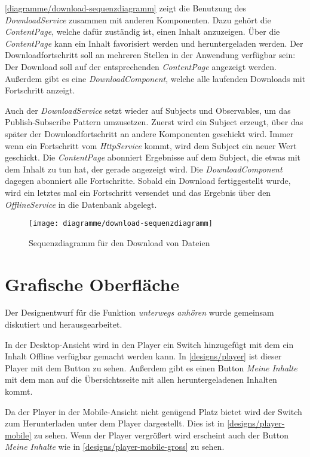 \autoref{diagramme/download-sequenzdiagramm} zeigt die Benutzung des \textit{DownloadService} zusammen mit anderen Komponenten. Dazu gehört die \textit{ContentPage}, welche dafür zuständig ist, einen Inhalt anzuzeigen. Über die \textit{ContentPage} kann ein Inhalt favorisiert werden und heruntergeladen werden. Der Downloadfortschritt soll an mehreren Stellen in der Anwendung verfügbar sein: Der Download soll auf der entsprechenden \textit{ContentPage} angezeigt werden. Außerdem gibt es eine \textit{DownloadComponent}, welche alle laufenden Downloads mit Fortschritt anzeigt. 

Auch der \textit{DownloadService} setzt wieder auf Subjects und Observables, um das Publish-Subscribe Pattern umzusetzen. Zuerst wird ein Subject erzeugt, über das später der Downloadfortschritt an andere Komponenten geschickt wird. Immer wenn ein Fortschritt vom \textit{HttpService} kommt, wird dem Subject ein neuer Wert geschickt. Die \textit{ContentPage} abonniert Ergebnisse auf dem Subject, die etwas mit dem Inhalt zu tun hat, der gerade angezeigt wird. Die \textit{DownloadComponent} dagegen abonniert alle Fortschritte. Sobald ein Download fertiggestellt wurde, wird ein letztes mal ein Fortschritt versendet und das Ergebnis über den \textit{OfflineService} in die Datenbank abgelegt.

\begin{sidewaysfigure}
 \texttt{[image: diagramme/download-sequenzdiagramm]}
  \caption{Sequenzdiagramm für den Download von Dateien}
  \label{diagramme/download-sequenzdiagramm}
\end{sidewaysfigure}

\section{Grafische Oberfläche}
Der Designentwurf für die Funktion \textit{unterwegs anhören} wurde gemeinsam diskutiert und herausgearbeitet. 

In der Desktop-Ansicht wird in den Player ein Switch hinzugefügt mit dem ein Inhalt Offline verfügbar gemacht werden kann. In \autoref{designs/player} ist dieser Player mit dem Button zu sehen. Außerdem gibt es einen Button \textit{Meine Inhalte} mit dem man auf die Übersichtsseite mit allen heruntergeladenen Inhalten kommt.


Da der Player in der Mobile-Ansicht nicht genügend Platz bietet wird der Switch zum Herunterladen unter dem Player dargestellt. Dies ist in \autoref{designs/player-mobile} zu sehen. Wenn der Player vergrößert wird erscheint auch der Button \textit{Meine Inhalte} wie in \autoref{designs/player-mobile-gross} zu sehen.

